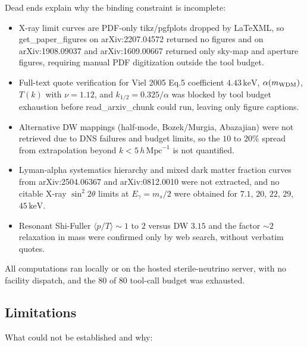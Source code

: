 \documentclass[11pt,a4paper]{article}
\begin{document}
Dead ends explain why the binding constraint is incomplete:

\begin{itemize}
  \item X-ray limit curves are PDF-only tikz/pgfplots dropped by LaTeXML, so get\_paper\_figures on arXiv:2207.04572 returned no figures and on arXiv:1908.09037 and arXiv:1609.00667 returned only sky-map and aperture figures, requiring manual PDF digitization outside the tool budget.
  \item Full-text quote verification for Viel 2005 Eq.5 coefficient $4.43\,\mathrm{keV}$, $\alpha(m_{\rm WDM})$, $T(k)$ with $\nu = 1.12$, and $k_{1/2} = 0.325/\alpha$ was blocked by tool budget exhaustion before read\_arxiv\_chunk could run, leaving only figure captions.
  \item Alternative DW mappings (half-mode, Bozek/Murgia, Abazajian) were not retrieved due to DNS failures and budget limits, so the $10$ to $20\%$ spread from extrapolation beyond $k < 5\,h\,\mathrm{Mpc}^{-1}$ is not quantified.
  \item Lyman-alpha systematics hierarchy and mixed dark matter fraction curves from arXiv:2504.06367 and arXiv:0812.0010 were not extracted, and no citable X-ray $\sin^2 2\theta$ limits at $E_\gamma = m_s/2$ were obtained for $7.1$, $20$, $22$, $29$, $45\,\mathrm{keV}$.
  \item Resonant Shi-Fuller $\langle p/T \rangle \sim 1$ to $2$ versus DW $3.15$ and the factor $\sim 2$ relaxation in mass were confirmed only by web search, without verbatim quotes.
\end{itemize}
All computations ran locally or on the hosted sterile-neutrino server, with no facility dispatch, and the $80$ of $80$ tool-call budget was exhausted.

\subsection{Limitations}
What could not be established and why:
\end{document}
